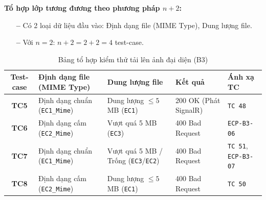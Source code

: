 \documentclass[11pt,a4paper]{article}
\begin{document}
\noindent\textbf{Tổ hợp lớp tương đương theo phương pháp $n+2$:}
\begin{itemize}[leftmargin=1.2cm, noitemsep]
    \item[\textbf{--}] Có 2 loại dữ liệu đầu vào: Định dạng file (MIME Type), Dung lượng file.
    \item[\textbf{--}] Với $n = 2$: $n + 2 = 2 + 2 = 4$ test-case.
\end{itemize}
\begin{table}[H]
\centering
\small
\begin{tabularx}{\textwidth}{|c|X|X|L{3.2cm}|C{2.2cm}|}
\hline
{}
\textbf{Test-case} & \textbf{Định dạng file (MIME Type)} & \textbf{Dung lượng file} & \textbf{Kết quả} & \textbf{Ánh xạ TC} \tabularnewline
\hline
\textbf{TC5} & Định dạng chuẩn (\texttt{EC1\_Mime}) & Dung lượng $\le 5$ MB (\texttt{EC1}) & 200 OK (Phát SignalR) & \texttt{TC 48} \\ \hline
\textbf{TC6} & Định dạng cấm (\texttt{EC2\_Mime}) & Vượt quá 5 MB (\texttt{EC3}) & 400 Bad Request & \texttt{ECP-B3-06} \\ \hline
\textbf{TC7} & Định dạng chuẩn (\texttt{EC1\_Mime}) & Vượt quá 5 MB / Trống (\texttt{EC3}/\texttt{EC2}) & 400 Bad Request & \texttt{TC 51}, \texttt{ECP-B3-07} \\ \hline
\textbf{TC8} & Định dạng cấm (\texttt{EC2\_Mime}) & Dung lượng $\le 5$ MB (\texttt{EC1}) & 400 Bad Request & \texttt{TC 50} \\ \hline
\end{tabularx}
\caption{Bảng tổ hợp kiểm thử tải lên ảnh đại diện (B3)}
\end{table}
\end{document}
